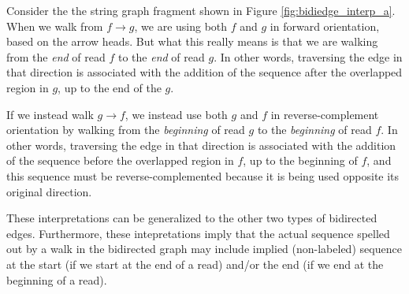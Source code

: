 \documentclass[10pt]{article}
\newcommand{\Figure}[1]{Figure \ref{#1}}
\begin{document}
Consider the the string graph fragment shown in \Figure{fig:bidiedge_interp_a}.
When we walk from $f \to g$, we are using both $f$ and $g$ in forward
orientation, based on the arrow heads.  But what this really means is that we
are walking from the {\em end} of read $f$ to the {\em end} of read $g$.  In
other words, traversing the edge in that direction is associated with the
addition of the sequence after the overlapped region in $g$, up to the end of
the $g$. 

If we instead walk $g \to f$, we instead use both $g$ and $f$ in
reverse-complement orientation by walking from the {\em beginning} of read $g$
to the {\em beginning} of read $f$.  In other words, traversing the edge in that
direction is associated with the addition of the sequence before the overlapped
region in $f$, up to the beginning of $f$, and this sequence must be
reverse-complemented because it is being used opposite its original direction.

These interpretations can be generalized to the other two types of bidirected
edges.  Furthermore, these intepretations imply that the actual sequence spelled
out by a walk in the bidirected graph may include implied (non-labeled) sequence
at the start (if we start at the end of a read) and/or the end (if we end at the
beginning of a read).
\end{document}

